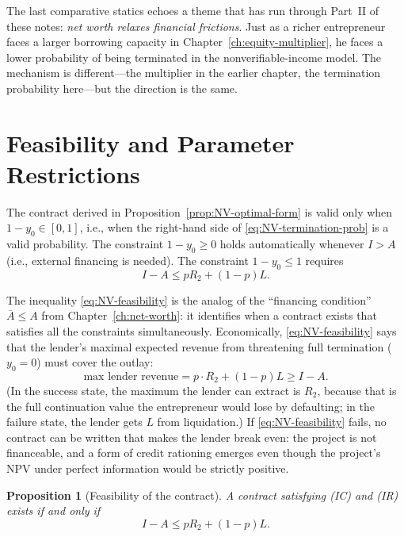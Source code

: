 \documentclass[11pt,a4paper,oneside]{book}
\def\leq{\leqslant}
\def\geq{\geqslant}
\theoremstyle{plain}
\newtheorem{proposition}[theorem]{Proposition}
\theoremstyle{definition}
\theoremstyle{remark}
\numberwithin{equation}{chapter}
\begin{document}
The last comparative statics echoes a theme that has run through Part~II of these notes: \emph{net worth relaxes financial frictions}.
Just as a richer entrepreneur faces a larger borrowing capacity in Chapter~\ref{ch:equity-multiplier}, he faces a lower probability of being terminated in the nonverifiable-income model.
The mechanism is different---the multiplier in the earlier chapter, the termination probability here---but the direction is the same.

\section{Feasibility and Parameter Restrictions}
\label{sec:NV-feasibility}

The contract derived in Proposition~\ref{prop:NV-optimal-form} is valid only when $1 - y_0 \in [0, 1]$, i.e., when the right-hand side of \eqref{eq:NV-termination-prob} is a valid probability.
The constraint $1 - y_0 \geq 0$ holds automatically whenever $I > A$ (i.e., external financing is needed).
The constraint $1 - y_0 \leq 1$ requires
\begin{equation}\label{eq:NV-feasibility}
  I - A \leq p R_2 + (1 - p) L.
\end{equation}

The inequality \eqref{eq:NV-feasibility} is the analog of the ``financing condition'' $\overline{A} \leq A$ from Chapter~\ref{ch:net-worth}: it identifies when a contract exists that satisfies all the constraints simultaneously.
Economically, \eqref{eq:NV-feasibility} says that the lender's maximal expected revenue from threatening full termination ($y_0 = 0$) must cover the outlay:
\begin{equation*}
  \text{max lender revenue}
  = p \cdot R_2 + (1 - p) L
  \geq I - A.
\end{equation*}
(In the success state, the maximum the lender can extract is $R_2$, because that is the full continuation value the entrepreneur would lose by defaulting; in the failure state, the lender gets $L$ from liquidation.)
If \eqref{eq:NV-feasibility} fails, no contract can be written that makes the lender break even: the project is not financeable, and a form of credit rationing emerges even though the project's NPV under perfect information would be strictly positive.

\begin{proposition}[Feasibility of the contract]\label{prop:NV-feasibility}
A contract satisfying \textup{(IC)} and \textup{(IR)} exists if and only if
\begin{equation*}
  I - A \leq p R_2 + (1 - p) L.
\end{equation*}
\end{proposition}
\end{document}
